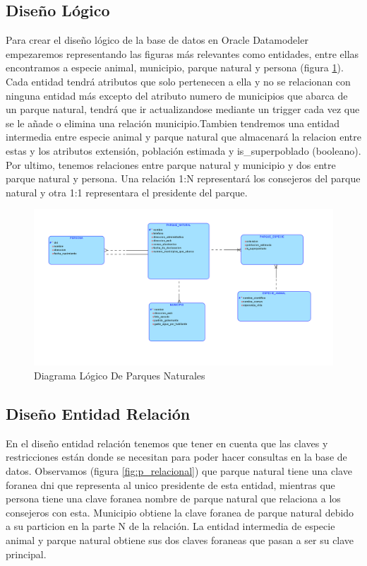 \documentclass{article}
\begin{document}
\newpage
\subsection{Diseño Lógico}

Para crear el diseño lógico de la base de datos en Oracle Datamodeler \cite{oracle2024} empezaremos representando las figuras más relevantes como entidades, entre ellas encontramos a especie animal, municipio, parque natural y persona (figura \ref{fig:p_logico}). Cada entidad tendrá atributos que solo pertenecen a ella y no se relacionan con ninguna entidad más excepto del atributo numero de municipios que abarca de un parque natural, tendrá que ir actualizandose mediante un trigger cada vez que se le añade o elimina una relación municipio.Tambien tendremos una entidad intermedia entre especie animal y parque natural que almacenará la relacion entre estas y los atributos extensión, población estimada y is\_superpoblado (booleano).
\\

Por ultimo, tenemos relaciones entre parque natural y municipio y dos entre parque natural y persona. Una relación 1:N representará los consejeros del parque natural y otra 1:1 representara el presidente del parque.

\begin{figure}[H]
	\centering
	\includegraphics[width=\textwidth]{images/diagrama_logico_parques_naturales.png}
	\caption{Diagrama Lógico De Parques Naturales}
	\label{fig:p_logico}
\end{figure}

\newpage

\subsection{Diseño Entidad Relación}

En el diseño entidad relación tenemos que tener en cuenta que las claves y restricciones están donde se necesitan para poder hacer consultas en la base de datos. Observamos (figura \ref{fig:p_relacional}) que parque natural tiene una clave foranea dni que representa al unico presidente de esta entidad, mientras que persona tiene una clave foranea nombre de parque natural que relaciona a los consejeros con esta. Municipio obtiene la clave foranea de parque natural debido a su particion en la parte N de la relación. La entidad intermedia de especie animal y parque natural obtiene sus dos claves foraneas que pasan a ser su clave principal.
\end{document}
